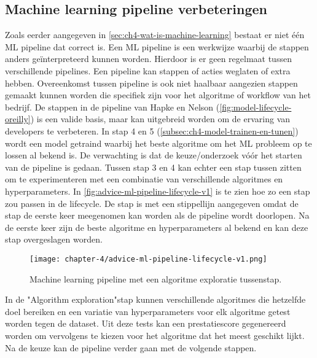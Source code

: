 \subsection{Machine learning pipeline verbeteringen}\label{subsec:ch4-machine-learning-pipeline-verbeteringen}
Zoals eerder aangegeven in \autoref{sec:ch4-wat-is-machine-learning} bestaat er niet één ML pipeline dat correct is. Een ML pipeline is een werkwijze waarbij de stappen anders geïnterpreteerd kunnen worden. Hierdoor is er geen regelmaat tussen verschillende pipelines. Een pipeline kan stappen of acties weglaten of extra hebben. Overeenkomst tussen pipeline is ook niet haalbaar aangezien stappen gemaakt kunnen worden die specifiek zijn voor het algoritme of workflow van het bedrijf. De stappen in de pipeline van Hapke en Nelson (\autoref{fig:model-lifecycle-oreilly}) is een valide basis, maar kan uitgebreid worden om de ervaring van developers te verbeteren. In stap 4 en 5 (\autoref{subsec:ch4-model-trainen-en-tunen}) wordt een model getraind waarbij het beste algoritme om het ML probleem op te lossen al bekend is. De verwachting is dat de keuze/onderzoek vóór het starten van de pipeline is gedaan. Tussen stap 3 en 4 kan echter een stap tussen zitten om te experimenteren met een combinatie van verschillende algoritmes en hyperparameters. In \autoref{fig:advice-ml-pipeline-lifecycle-v1} is te zien hoe zo een stap zou passen in de lifecycle. De stap is met een stippellijn aangegeven omdat de stap de eerste keer meegenomen kan worden als de pipeline wordt doorlopen. Na de eerste keer zijn de beste algoritme en hyperparameters al bekend en kan deze stap overgeslagen worden.

\newpage

\begin{figure}[hbt!]
  \centering
  \texttt{[image: chapter-4/advice-ml-pipeline-lifecycle-v1.png]}
  \caption{Machine learning pipeline met een algoritme exploratie tussenstap.}
  \label{fig:advice-ml-pipeline-lifecycle-v1}
\end{figure}

In de "Algorithm exploration"\space stap kunnen verschillende algoritmes die hetzelfde doel bereiken en een variatie van hyperparameters voor elk algoritme getest worden tegen de dataset. Uit deze tests kan een prestatiescore gegenereerd worden om vervolgens te kiezen voor het algoritme dat het meest geschikt lijkt. Na de keuze kan de pipeline verder gaan met de volgende stappen.

